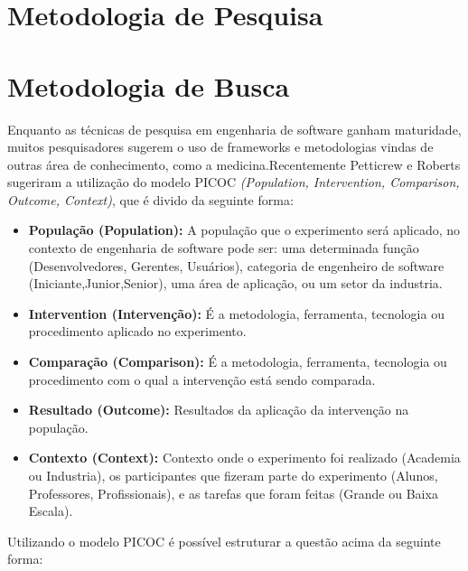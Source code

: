 \section{Metodologia de Pesquisa}

\section{Metodologia de Busca}
Enquanto as técnicas de pesquisa em engenharia de software
ganham maturidade, muitos pesquisadores sugerem o uso de frameworks e metodologias
vindas de outras área de conhecimento, como a medicina\cite{guidelines}.Recentemente
Petticrew e Roberts sugeriram a utilização do modelo PICOC \textit{(Population,
Intervention, Comparison, Outcome, Context)}, que é divido da seguinte forma\cite{petticrew}:

\begin{itemize}
    \item \textbf{População (Population):} A população que o experimento será
        aplicado, no contexto de engenharia de software pode ser: uma determinada
        função (Desenvolvedores, Gerentes, Usuários), categoria de engenheiro de
        software (Iniciante,Junior,Senior), uma área de aplicação, ou um setor
        da industria.
    \item \textbf{Intervention (Intervenção):} É a metodologia, ferramenta,
        tecnologia ou procedimento aplicado no experimento.
    \item \textbf{Comparação (Comparison):} É a metodologia, ferramenta,
        tecnologia ou procedimento com o qual a intervenção está sendo comparada.
    \item \textbf{Resultado  (Outcome):} Resultados da aplicação da intervenção na
        população.
    \item \textbf{Contexto (Context):} Contexto onde o experimento foi realizado
        (Academia ou Industria), os participantes que fizeram parte do experimento
        (Alunos, Professores, Profissionais), e as tarefas que foram feitas
        (Grande ou Baixa Escala).
\end{itemize}

Utilizando o modelo PICOC é possível estruturar a questão acima da seguinte forma:


